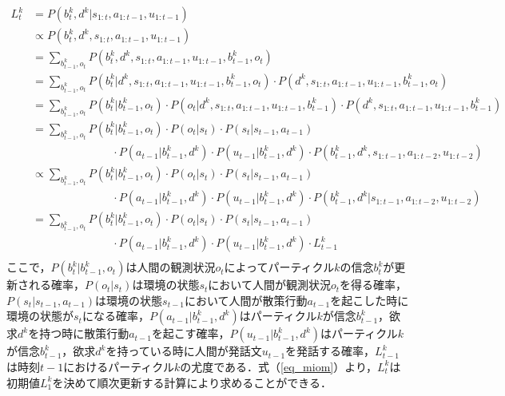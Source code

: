 \begin{equation}
  \begin{split}
  \label{eq_miom}
  L^k_t&=P(b_t^k,d^k|s_{1:t},a_{1:t-1},u_{1:t-1})\\
  &\propto P(b_t^k,d^k,s_{1:t},a_{1:t-1},u_{1:t-1})\\
  &= \sum_{b_{t-1}^k,o_t}P(b_t^k,d^k,s_{1:t},a_{1:t-1},u_{1:t-1},b_{t-1}^k,o_t)\\
  &= \sum_{b_{t-1}^k,o_t}P(b_t^k|d^k,s_{1:t},a_{1:t-1},u_{1:t-1},b_{t-1}^k,o_t)\cdot P(d^k,s_{1:t},a_{1:t-1},u_{1:t-1},b_{t-1}^k,o_t)\\
  &= \sum_{b_{t-1}^k,o_t}P(b_t^k|b_{t-1}^k,o_t)\cdot P(o_t|d^k,s_{1:t},a_{1:t-1},u_{1:t-1},b_{t-1}^k)\cdot P(d^k,s_{1:t},a_{1:t-1},u_{1:t-1},b_{t-1}^k)\\
  &= \sum_{b_{t-1}^k,o_t}P(b_t^k|b_{t-1}^k,o_t)\cdot P(o_t|s_t)\cdot P(s_t|s_{t-1},a_{t-1})\\
  &\hspace{3cm} \cdot P(a_{t-1}|b_{t-1}^k,d^k)\cdot P(u_{t-1}|b_{t-1}^k,d^k)\cdot P(b_{t-1}^k,d^k,s_{1:t-1},a_{1:t-2},u_{1:t-2})\\
  &\propto \sum_{b_{t-1}^k,o_t}P(b_t^k|b_{t-1}^k,o_t)\cdot P(o_t|s_t)\cdot P(s_t|s_{t-1},a_{t-1})\\
  &\hspace{3cm} \cdot P(a_{t-1}|b_{t-1}^k,d^k)\cdot P(u_{t-1}|b_{t-1}^k,d^k)\cdot P(b_{t-1}^k,d^k|s_{1:t-1},a_{1:t-2},u_{1:t-2})\\
  &= \sum_{b_{t-1}^k,o_t}P(b_t^k|b_{t-1}^k,o_t)\cdot P(o_t|s_t)\cdot P(s_t|s_{t-1},a_{t-1})\\
  &\hspace{3cm} \cdot P(a_{t-1}|b_{t-1}^k,d^k)\cdot P(u_{t-1}|b_{t-1}^k,d^k)\cdot L^k_{t-1}\\
  \end{split}
\end{equation}
ここで，$P(b_t^k|b_{t-1}^k,o_t)$は人間の観測状況$o_t$によってパーティクル$k$の信念$b_t^k$が更新される確率，$P(o_t|s_t)$は環境の状態$s_t$において人間が観測状況$o_t$を得る確率，$P(s_t|s_{t-1},a_{t-1})$は環境の状態$s_{t-1}$において人間が散策行動$a_{t-1}$を起こした時に環境の状態が$s_{t}$になる確率，$P(a_{t-1}|b_{t-1}^k,d^k)$はパーティクル$k$が信念$b_{t-1}^k$，欲求$d^k$を持つ時に散策行動$a_{t-1}$を起こす確率，$P(u_{t-1}|b_{t-1}^k,d^k)$はパーティクル$k$が信念$b_{t-1}^k$，欲求$d^k$を持っている時に人間が発話文$u_{t-1}$を発話する確率，$L_{t-1}^k$は時刻$t-1$におけるパーティクル$k$の尤度である．式（\ref{eq_miom}）より，$L^k_t$は初期値$L^k_1$を決めて順次更新する計算により求めることができる．

